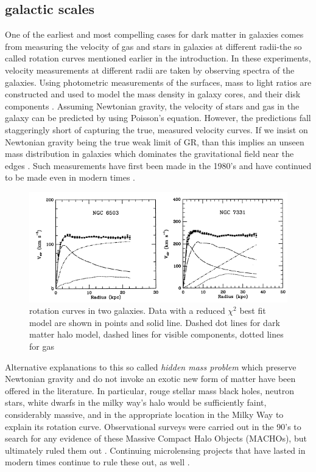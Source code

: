 \documentclass[12pt]{article}
\begin{document}
\subsection{galactic scales}

One of the earliest and most compelling cases for dark matter in galaxies comes from measuring the velocity of gas and stars in galaxies at different radii-the so called rotation curves mentioned earlier in the introduction. In these experiments, velocity measurements at different radii are taken by observing spectra of the galaxies. Using photometric measurements of the surfaces, mass to light ratios are constructed and used to model the mass  density in galaxy cores, and their disk components \cite{Bertone2004}. Assuming Newtonian gravity, the velocity of stars and gas in the galaxy can be predicted by using Poisson's equation. However, the predictions fall staggeringly short of capturing the true, measured velocity curves. If we insist on Newtonian gravity being the true weak limit of GR, than this implies an unseen mass distribution in galaxies which dominates the gravitational field near the edges \cite{Begeman1991}. Such measurements have first been made in the 1980's \cite{Knapp1987} and have continued to be made even in modern times \cite{Bertone2004}.
\begin{figure}
\centering
\includegraphics[width=5in]{darkMatterRotation.png}
\caption{rotation curves in two galaxies. Data with a reduced $\chi^{2 }$ best fit model are shown in points and solid line. Dashed dot lines for dark matter halo model, dashed lines for visible components, dotted lines for gas \cite{Begeman1991}}
\end{figure}
Alternative explanations to this so called \emph{hidden mass problem} which preserve Newtonian gravity and do not invoke an exotic new form of matter have been offered in the literature. In particular, rouge stellar mass black holes, neutron stars, white dwarfs in the milky way's halo would be sufficiently faint, considerably massive, and in the appropriate location in the Milky Way to explain its rotation curve. Observational surveys were carried out in the 90's to search for any evidence of these Massive Compact Halo Objects (MACHOs), but ultimately ruled them out \cite{Becker2005} \cite{Alcock2000}. Continuing microlensing projects that have lasted in modern times continue to rule these out, as well \cite{OGEL} \cite{MOA}.
\end{document}
